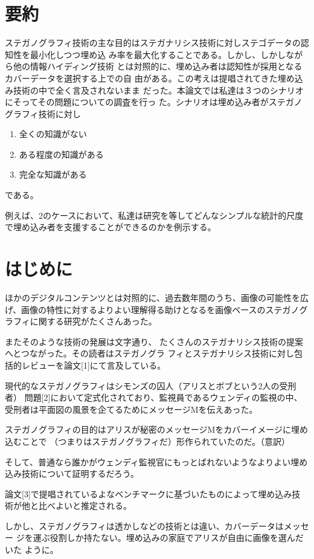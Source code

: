 \documentclass[a4j,fleqn,10pt]{jsarticle}
\begin{document}
\section{要約}
ステガノグラフィ技術の主な目的はステガナリシス技術に対しステゴデータの認知性を最小化しつつ埋め込
み率を最大化することである。しかし、しかしながら他の情報ハイディング技術
とは対照的に、埋め込み者は認知性が採用となるカバーデータを選択する上での自
由がある。この考えは提唱されてきた埋め込み技術の中で全く言及されないまま
だった。本論文では私達は３つのシナリオにそってその問題についての調査を行っ
た。シナリオは埋め込み者がステガノグラフィ技術に対し

\begin{enumerate}
 \item 全くの知識がない
 \item ある程度の知識がある
 \item 完全な知識がある
\end{enumerate}

である。

例えば、2のケースにおいて、私達は研究を等してどんなシンプルな統計的尺度
で埋め込み者を支援することができるのかを例示する。

\section{はじめに}
ほかのデジタルコンテンツとは対照的に、過去数年間のうち、画像の可能性を広
げ、画像の特性に対するよりよい理解得る助けとなるを画像ベースのステガノグ
ラフィに関する研究がたくさんあった。

またそのような技術の発展は文字通り、
たくさんのステガナリシス技術の提案へとつながった。その読者はステガノグラ
フィとステガナリシス技術に対し包括的レビューを論文[1]にて言及している。

現代的なステガノグラフィはシモンズの囚人（アリスとボブという2人の受刑者）
問題[2]において定式化されており、監視員であるウェンディの監視の中、
受刑者は平面図の風景を企てるためにメッセージMを伝えあった。

ステガノグラフィの目的はアリスが秘密のメッセージMをカバーイメージに埋め込むことで
（つまりはステガノグラフィだ）形作られていたのだ。（意訳）

そして、普通なら誰かがウェンディ監視官にもっとばれないようなよりよい埋め
込み技術について証明するだろう。

論文[3]で提唱されているよなベンチマークに基づいたものによって埋め込み技
術が他と比べよいと推定される。

しかし、ステガノグラフィは透かしなどの技術とは違い、カバーデータはメッセー
ジを運ぶ役割しか持たない。埋め込みの家庭でアリスが自由に画像を選んだいた
ように。
\end{document}
